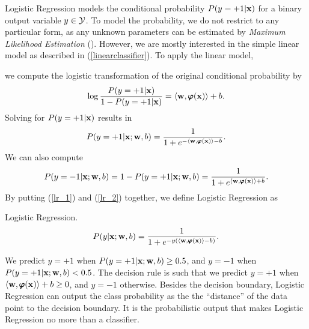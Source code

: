 {Logistic Regression models the conditional probability $P(y=+1|\mathbf {x})$ for a binary output variable $y\in\mathcal{Y}$.
To model the probability, we do not restrict to any particular form, as any unknown parameters can be estimated by \textit{Maximum Likelihood Estimation} (\mle).
However, we are mostly interested in the simple linear model as described in (\ref{linearclassifier}).
To apply the linear model,

we compute the logistic transformation of the original conditional probability by
\begin{align*}
	\log\frac{P(y=+1|\mathbf {x})}{1-P(y=+1|\mathbf {x})} = \langle \mathbf {w}, \pmb \varphi(\mathbf {x}) \rangle + b.
\end{align*}
Solving for $P(y=+1|\mathbf {x})$ results in 
\begin{align}
	P(y=+1|\mathbf {x};\mathbf {w},b) = \frac{1}{1+e^{ -\langle \mathbf {w}, \pmb \varphi(\mathbf {x}) \rangle-b }}. \label{lr_1}
\end{align}
We can also compute
\begin{align}
	P(y=-1|\mathbf {x};\mathbf {w},b)=1-P(y=+1|\mathbf {x};\mathbf {w},b)=\frac{1}{1+e^{ \langle \mathbf {w}, \pmb \varphi(\mathbf {x}) \rangle+b }}. \label{lr_2}
\end{align}
By putting (\ref{lr_1}) and (\ref{lr_2}) together, we define Logistic Regression as
\begin{definition}{Logistic Regression.} \label{logistic_regression}
	\begin{align*}
		P(y|\mathbf {x};\mathbf {w},b) = \frac{1}{1+e^{ -y(\langle \mathbf {w}, \pmb \varphi(\mathbf {x}) \rangle-b) }}.
	\end{align*}
\end{definition}
We predict $y=+1$ when $P(y=+1|\mathbf {x};\mathbf {w},b)\ge0.5$, and $y=-1$ when $P(y=+1|\mathbf {x};\mathbf {w},b)<0.5$.
The decision rule is such that we predict $y=+1$ when $\langle \mathbf {w}, \pmb \varphi(\mathbf {x}) \rangle+b\ge0$, and $y=-1$ otherwise.
Besides the decision boundary, Logistic Regression can output the class probability as the the ``distance'' of the data point to the decision boundary.
It is the probabilistic output that makes Logistic Regression no more than a classifier.

}
